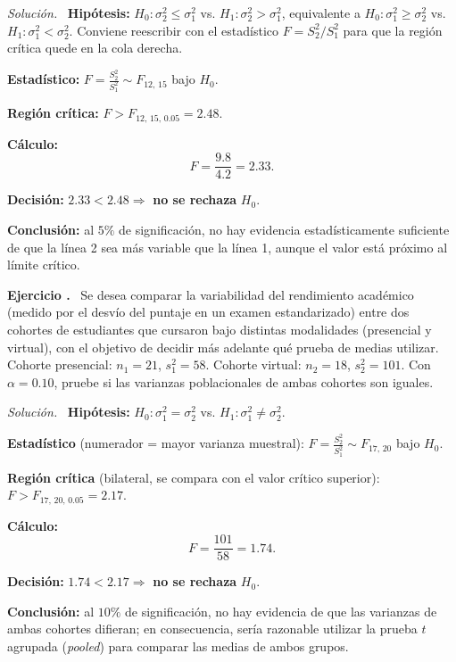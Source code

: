 \documentclass[11pt,a4paper]{article}
\newcounter{ejnum}
\newenvironment{ejercicio}{\refstepcounter{ejnum}\par\medskip\noindent\textbf{Ejercicio \theejnum.}~}{\par}
\newenvironment{solucion}{\par\noindent\textit{Solución.}~}{\par\vspace{1em}}
\begin{document}
\begin{solucion}
\textbf{Hipótesis:} $H_0:\sigma_2^2\le\sigma_1^2$ vs. $H_1:\sigma_2^2>\sigma_1^2$, equivalente a $H_0:\sigma_1^2\ge\sigma_2^2$ vs. $H_1:\sigma_1^2<\sigma_2^2$. Conviene reescribir con el estadístico $F=S_2^2/S_1^2$ para que la región crítica quede en la cola derecha.

\textbf{Estadístico:} $\displaystyle F=\frac{S_2^2}{S_1^2}\sim F_{12,\,15}$ bajo $H_0$.

\textbf{Región crítica:} $F>F_{12,\,15,\,0.05}=2.48$.

\textbf{Cálculo:}
\[
F=\frac{9.8}{4.2}=2.33.
\]

\textbf{Decisión:} $2.33<2.48\Rightarrow$ \textbf{no se rechaza} $H_0$.

\textbf{Conclusión:} al $5\%$ de significación, no hay evidencia estadísticamente suficiente de que la línea 2 sea más variable que la línea 1, aunque el valor está próximo al límite crítico.
\end{solucion}

\begin{ejercicio}
Se desea comparar la variabilidad del rendimiento académico (medido por el desvío del puntaje en un examen estandarizado) entre dos cohortes de estudiantes que cursaron bajo distintas modalidades (presencial y virtual), con el objetivo de decidir más adelante qué prueba de medias utilizar. Cohorte presencial: $n_1=21$, $s_1^2=58$. Cohorte virtual: $n_2=18$, $s_2^2=101$. Con $\alpha=0.10$, pruebe si las varianzas poblacionales de ambas cohortes son iguales.
\end{ejercicio}

\begin{solucion}
\textbf{Hipótesis:} $H_0:\sigma_1^2=\sigma_2^2$ vs. $H_1:\sigma_1^2\neq\sigma_2^2$.

\textbf{Estadístico} (numerador = mayor varianza muestral): $\displaystyle F=\frac{S_2^2}{S_1^2}\sim F_{17,\,20}$ bajo $H_0$.

\textbf{Región crítica} (bilateral, se compara con el valor crítico superior): $F>F_{17,\,20,\,0.05}=2.17$.

\textbf{Cálculo:}
\[
F=\frac{101}{58}=1.74.
\]

\textbf{Decisión:} $1.74<2.17\Rightarrow$ \textbf{no se rechaza} $H_0$.

\textbf{Conclusión:} al $10\%$ de significación, no hay evidencia de que las varianzas de ambas cohortes difieran; en consecuencia, sería razonable utilizar la prueba $t$ agrupada (\emph{pooled}) para comparar las medias de ambos grupos.
\end{solucion}
\end{document}
